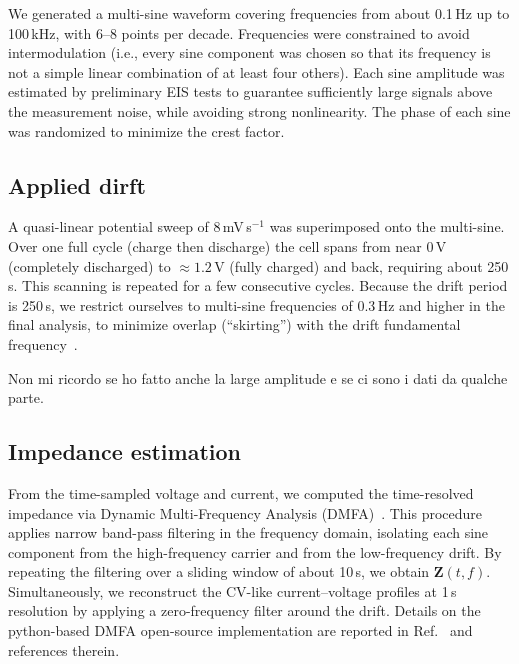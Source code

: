 We generated a multi-sine waveform covering frequencies from about 0.1\,Hz up to 100\,kHz, with 6--8 points per decade. Frequencies were constrained to avoid intermodulation (i.e., every sine component was chosen so that its frequency is not a simple linear combination of at least four others). Each sine amplitude was estimated by preliminary EIS tests to guarantee sufficiently large signals above the measurement noise, while avoiding strong nonlinearity. The phase of each sine was randomized to minimize the crest factor.

\subsection{Applied dirft}
A quasi-linear potential sweep of 8\,mV\,s$^{-1}$ was superimposed onto the multi-sine. Over one full cycle (charge then discharge) the cell spans from near 0\,V (completely discharged) to $\approx1.2$\,V (fully charged) and back, requiring about 250\,s. This scanning is repeated for a few consecutive cycles. Because the drift period is 250\,s, we restrict ourselves to multi-sine frequencies of 0.3\,Hz and higher in the final analysis, to minimize overlap (``skirting'') with the drift fundamental frequency~\cite{Battistel2019}.

Non mi ricordo se ho fatto anche la large amplitude e se ci sono i dati da qualche parte.

\subsection{Impedance estimation}

From the time-sampled voltage and current, we computed the time-resolved impedance via Dynamic Multi-Frequency Analysis (DMFA)~\cite{Koster2017,Pianta2023}. This procedure applies narrow band-pass filtering in the frequency domain, isolating each sine component from the high-frequency carrier and from the low-frequency drift. By repeating the filtering over a sliding window of about 10\,s, we obtain $\mathbf{Z}(t,f)$. Simultaneously, we reconstruct the CV-like current--voltage profiles at 1\,s resolution by applying a zero-frequency filter around the drift. Details on the python-based DMFA open-source implementation are reported in Ref.~\cite{Chukwu2022} and references therein.

